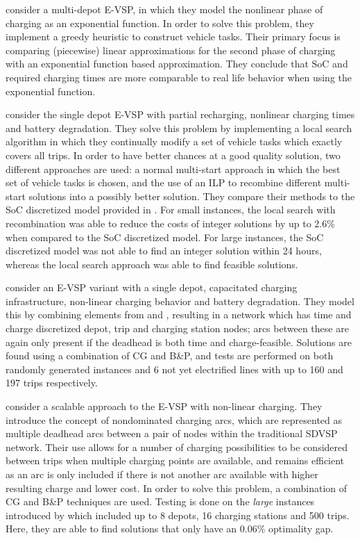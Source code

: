 \documentclass[]{article}
\begin{document}
\citet{Olsen2020} consider a multi-depot E-VSP, in which they model the nonlinear phase of charging as an exponential function. In order to solve this problem, they implement a greedy heuristic to construct vehicle tasks. Their primary focus is comparing (piecewise) linear approximations for the second phase of charging with an exponential function based approximation. They conclude that SoC and required charging times are more comparable to real life behavior when using the exponential function.

 consider the single depot E-VSP with partial recharging, nonlinear charging times and battery degradation. They solve this problem by implementing a local search algorithm in which they continually modify a set of vehicle tasks which exactly covers all trips. In order to have better chances at a good quality solution, two different approaches are used: a normal multi-start approach in which the best set of vehicle tasks is chosen, and the use of an ILP to recombine different multi-start solutions into a possibly better solution. They compare their methods to the SoC discretized model provided in \citet{vanKootenNiekerk2017}. For small instances, the local search with recombination was able to reduce the costs of integer solutions by up to 2.6\% when compared to the SoC discretized model. For large instances, the SoC discretized model was not able to find an integer solution within 24 hours, whereas the local search approach was able to find feasible solutions.

\citet{Zhang2021} consider an E-VSP variant with a single depot, capacitated charging infrastructure, non-linear charging behavior and battery degradation. They model this by combining elements from \citet{Li2014} and \citet{vanKootenNiekerk2017}, resulting in a network which has time and charge discretized depot, trip and charging station nodes; arcs between these are again only present if the deadhead is both time and charge-feasible. Solutions are found using a combination of CG and B\&P, and tests are performed on both randomly generated instances and 6 not yet electrified lines with up to 160 and 197 trips respectively.

\citet{Parmentier2023} consider a scalable approach to the E-VSP with non-linear charging. They introduce the concept of nondominated charging arcs, which are represented as multiple deadhead arcs between a pair of nodes within the traditional SDVSP network. Their use allows for a number of charging possibilities to be considered between trips when multiple charging points are available, and remains efficient as an arc is only included if there is not another arc available with higher resulting charge and lower cost. In order to solve this problem, a combination of CG and B\&P techniques are used. Testing is done on the \textit{large} instances introduced by \citet{Wen2016} which included up to 8 depots, 16 charging stations and 500 trips. Here, they are able to find solutions that only have an 0.06\% optimality gap.
\end{document}
